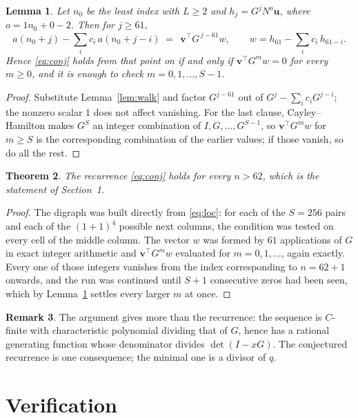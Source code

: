 \documentclass[11pt,a4paper]{article}
\theoremstyle{plain}
\newtheorem{theorem}{Theorem}
\newtheorem{lemma}[theorem]{Lemma}
\theoremstyle{definition}
\newtheorem{remark}[theorem]{Remark}
\begin{document}
\begin{lemma}\label{lem:crit}
Let $n_0$ be the least index with $L\ge2$ and $h_j=G^{j}N^{o}\mathbf{u}$, where
$o=1n_0+0-2$. Then for $j\ge61$,
\[
a(n_0+j)-\sum_i c_i\,a(n_0+j-i)\;=\;\,\mathbf{v}^{\!\top}G^{\,j-61}w,
\qquad w=h_{61}-\sum_i c_i\,h_{61-i} .
\]
Hence \eqref{eq:conj} holds from that point on if and only if
$\mathbf{v}^{\!\top}G^{m}w=0$ for every $m\ge0$, and it is enough to check
$m=0,1,\dots,S-1$.
\end{lemma}

\begin{proof}
Substitute Lemma~\ref{lem:walk} and factor $G^{j-61}$ out of
$G^{j}-\sum_ic_iG^{j-i}$; the nonzero scalar $1$ does not affect
vanishing. For the last clause, Cayley--Hamilton makes $G^{S}$ an integer combination of
$I,G,\dots,G^{S-1}$, so $\mathbf{v}^{\!\top}G^{m}w$ for $m\ge S$ is the corresponding
combination of the earlier values; if those vanish, so do all the rest.
\end{proof}

\begin{theorem}
The recurrence \eqref{eq:conj} holds for every $n>62$, which is the statement of
Section~1.
\end{theorem}

\begin{proof}
The digraph was built directly from \eqref{eq:loc}: for each of the $S=256$ pairs and each
of the $(1+1)^{4}$ possible next columns, the condition was tested on every cell of
the middle column. The vector $w$ was formed by $61$ applications of $G$ in exact integer
arithmetic and $\mathbf{v}^{\!\top}G^{m}w$ evaluated for $m=0,1,\dots$, again exactly.
Every one of those integers vanishes from the index corresponding to $n=62+1$ onwards,
and the run was continued until $S+1$ consecutive zeros had been seen, which by
Lemma~\ref{lem:crit} settles every larger $m$ at once.
\end{proof}

\begin{remark}
The argument gives more than the recurrence: the sequence is $C$-finite with characteristic
polynomial dividing that of $G$, hence has a rational generating function whose denominator
divides $\det(I-xG)$. The conjectured recurrence is one consequence; the minimal one is a
divisor of $q$.
\end{remark}

\section{Verification}
\end{document}
